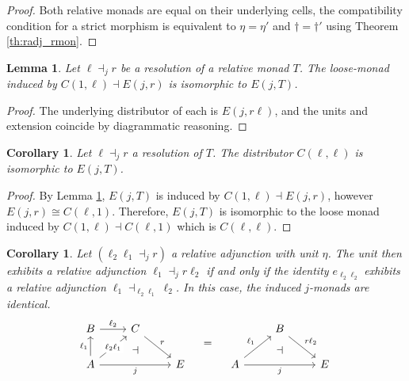\documentclass[10pt,a4paper]{article}
\newcommand{\simeqq}{\cong}
\theoremstyle{plain}
\newtheorem{corollary}[theorem]{Corollary}
\newtheorem{lemma}[theorem]{Lemma}
\theoremstyle{definition}
\theoremstyle{remark}
\begin{document}
\begin{proof}
    Both relative monads are equal on their underlying cells, the compatibility condition for a strict morphism is equivalent to $\eta = \eta'$ and $\dag = \dag'$ using Theorem \ref{th:radj_rmon}.
\end{proof}

\begin{lemma}
    \label{lem:reso_lmon}
    Let $\ell\dashv_jr$ be a resolution of a relative monad $T$. The loose-monad induced by $C(1, \ell)\dashv E(j, r)$ is isomorphic to $E(j, T)$.
\end{lemma}

\begin{proof}
    The underlying distributor of each is $E(j, r\ell)$, and the units and extension coincide by diagrammatic reasoning.
\end{proof}

\begin{corollary}
    Let $\ell\dashv_jr$ a resolution of $T$. The distributor $C(\ell, \ell)$ is isomorphic to $E(j, T)$.
\end{corollary}

\begin{proof}
    By Lemma \ref{lem:reso_lmon}, $E(j, T)$ is induced by $C(1, \ell) \dashv E(j, r)$, however $E(j, r) \simeqq C(\ell, 1)$. Therefore, $E(j, T)$ is isomorphic to the loose monad induced by $C(1, \ell)\dashv C(\ell, 1)$ which is $C(\ell, \ell)$.
\end{proof}

\begin{corollary}
    Let $(\ell_2\ell_1\dashv_j r)$ a relative adjunction with unit $\eta$. The unit then exhibits a relative adjunction $\ell_1\dashv_jr\ell_2$ if and only if the identity $e_{\ell_2\ell_2}$ exhibits a relative adjunction $\ell_1\dashv_{\ell_2\ell_1}\ell_2$. In this case, the induced $j$-monads are identical.
    \[\begin{tikzcd}
        B \ar[r, "\ell_2"] & C \ar[dr, "r"] &\\
        A \ar[u, "\ell_1"] \ar[ur, "\ell_2\ell_1"{description}] \ar[rr, "j"'] &{}& E
        \ar[from=1-2, to=2-2, phantom, "\dashv"]
    \end{tikzcd}
    \hspace{1em}=\hspace{1em}
    \begin{tikzcd}
        & B \ar[dr, "r\ell_2"] &\\
        A \ar[ur, "\ell_1"] \ar[rr, "j"'] &{}& E
        \ar[from=1-2, to=2-2, phantom, "\dashv"]
    \end{tikzcd}\]
\end{corollary}
\end{document}
